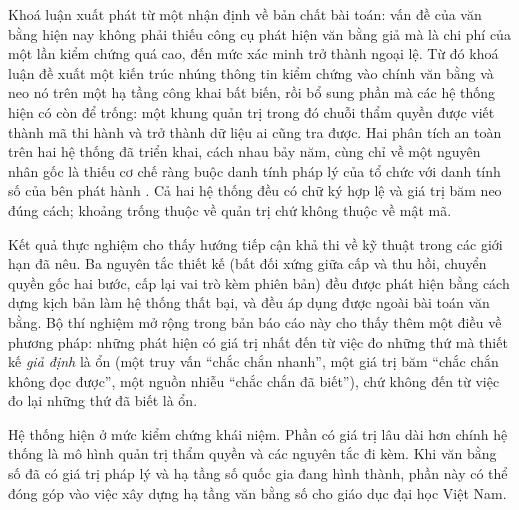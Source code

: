 Khoá luận xuất phát từ một nhận định về bản chất bài toán: vấn đề của văn bằng hiện nay không phải thiếu công cụ phát hiện văn bằng giả mà là chi phí của một lần kiểm chứng quá cao, đến mức xác minh trở thành ngoại lệ. Từ đó khoá luận đề xuất một kiến trúc nhúng thông tin kiểm chứng vào chính văn bằng và neo nó trên một hạ tầng công khai bất biến, rồi bổ sung phần mà các hệ thống hiện có còn để trống: một khung quản trị trong đó chuỗi thẩm quyền được viết thành mã thi hành và trở thành dữ liệu ai cũng tra được. Hai phân tích an toàn trên hai hệ thống đã triển khai, cách nhau bảy năm, cùng chỉ về một nguyên nhân gốc là thiếu cơ chế ràng buộc danh tính pháp lý của tổ chức với danh tính số của bên phát hành \cite{Baldi2019, Zonneveld2026}. Cả hai hệ thống đều có chữ ký hợp lệ và giá trị băm neo đúng cách; khoảng trống thuộc về quản trị chứ không thuộc về mật mã.

Kết quả thực nghiệm cho thấy hướng tiếp cận khả thi về kỹ thuật trong các giới hạn đã nêu. Ba nguyên tắc thiết kế (bất đối xứng giữa cấp và thu hồi, chuyển quyền gốc hai bước, cấp lại vai trò kèm phiên bản) đều được phát hiện bằng cách dựng kịch bản làm hệ thống thất bại, và đều áp dụng được ngoài bài toán văn bằng. Bộ thí nghiệm mở rộng trong bản báo cáo này cho thấy thêm một điều về phương pháp: những phát hiện có giá trị nhất đến từ việc đo những thứ mà thiết kế \emph{giả định} là ổn (một truy vấn ``chắc chắn nhanh'', một giá trị băm ``chắc chắn không đọc được'', một nguồn nhiễu ``chắc chắn đã biết''), chứ không đến từ việc đo lại những thứ đã biết là ổn.

Hệ thống hiện ở mức kiểm chứng khái niệm. Phần có giá trị lâu dài hơn chính hệ thống là mô hình quản trị thẩm quyền và các nguyên tắc đi kèm. Khi văn bằng số đã có giá trị pháp lý và hạ tầng số quốc gia đang hình thành, phần này có thể đóng góp vào việc xây dựng hạ tầng văn bằng số cho giáo dục đại học Việt Nam.
